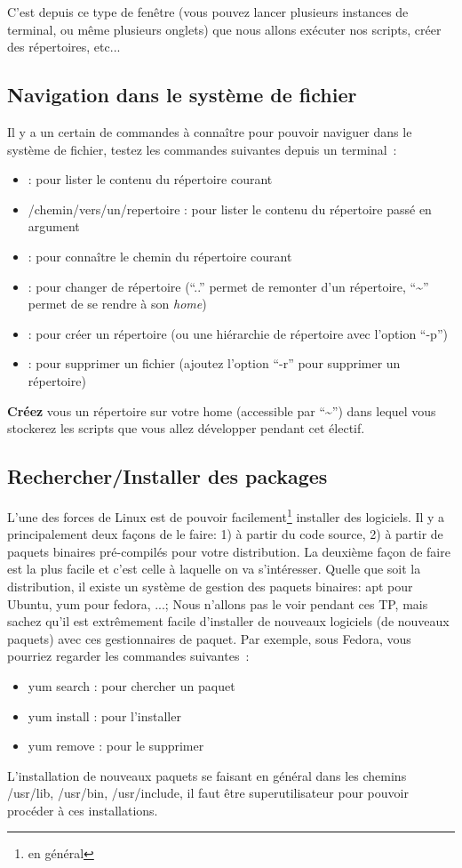C'est depuis ce type de fenêtre (vous pouvez lancer plusieurs instances de terminal, ou même plusieurs onglets) que nous allons exécuter nos scripts, créer des répertoires, etc...

\subsection{Navigation dans le système de fichier}

Il y a un certain de commandes à connaître pour pouvoir naviguer dans le système de fichier, testez les commandes suivantes depuis un terminal~:
\begin{itemize}
\item \ls : pour lister le contenu du répertoire courant
\item \ls /chemin/vers/un/repertoire : pour lister le contenu du répertoire passé en argument
\item \pwd : pour connaître le chemin du répertoire courant
\item \cd : pour changer de répertoire (``\cd ..'' permet de remonter d'un répertoire, ``\cd \textasciitilde'' permet de se rendre à son \emph{home})
\item \mkdir : pour créer un répertoire (ou une hiérarchie de répertoire avec l'option ``-p'')
\item \myrm : pour supprimer un fichier (ajoutez l'option ``-r'' pour supprimer un répertoire)
\end{itemize}

\textbf{Créez} vous un répertoire sur votre home (accessible par ``\cd \textasciitilde'') dans lequel vous stockerez les scripts que vous allez développer pendant cet électif.

\subsection{Rechercher/Installer des packages}

L'une des forces de Linux est de pouvoir facilement\footnote{en général} installer des logiciels. Il y a principalement deux façons de le faire: 1) à partir du code source, 2) à partir de paquets binaires pré-compilés pour votre distribution. La deuxième façon de faire est la plus facile et c'est celle à laquelle on va s'intéresser. Quelle que soit la distribution, il existe un système de gestion des paquets binaires: apt pour Ubuntu, yum pour fedora, ...; Nous n'allons pas le voir pendant ces TP, mais sachez qu'il est extrêmement facile d'installer de nouveaux logiciels (de nouveaux paquets) avec ces gestionnaires de paquet. Par exemple, sous Fedora, vous pourriez regarder les commandes suivantes~:
\begin{itemize}
\item yum search : pour chercher un paquet
\item yum install : pour l'installer
\item yum remove : pour le supprimer
\end{itemize}
L'installation de nouveaux paquets se faisant en général dans les chemins /usr/lib, /usr/bin, /usr/include, il faut être superutilisateur pour pouvoir procéder à ces installations.


